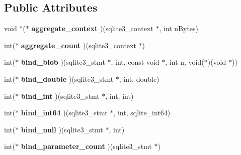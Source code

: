 \subsection*{Public Attributes}
\begin{DoxyCompactItemize}
\item 
\mbox{\label{structsqlite3__api__routines_a16fafb5f2460657f528338aee5f65d25}} 
void $\ast$($\ast$ {\bfseries aggregate\+\_\+context} )(sqlite3\+\_\+context $\ast$, int n\+Bytes)
\item 
\mbox{\label{structsqlite3__api__routines_a8373f7a5dd2d6f1c86bbf024b1796156}} 
int($\ast$ {\bfseries aggregate\+\_\+count} )(sqlite3\+\_\+context $\ast$)
\item 
\mbox{\label{structsqlite3__api__routines_afeb41d70ab5a221fec488560934c825b}} 
int($\ast$ {\bfseries bind\+\_\+blob} )(sqlite3\+\_\+stmt $\ast$, int, const void $\ast$, int n, void($\ast$)(void $\ast$))
\item 
\mbox{\label{structsqlite3__api__routines_aca43a229ce28397ba8c18a4d6e03e40c}} 
int($\ast$ {\bfseries bind\+\_\+double} )(sqlite3\+\_\+stmt $\ast$, int, double)
\item 
\mbox{\label{structsqlite3__api__routines_a6fef49e6c9c1fa573c55cc6668a8448f}} 
int($\ast$ {\bfseries bind\+\_\+int} )(sqlite3\+\_\+stmt $\ast$, int, int)
\item 
\mbox{\label{structsqlite3__api__routines_a489304cada65abca390da9b751da8800}} 
int($\ast$ {\bfseries bind\+\_\+int64} )(sqlite3\+\_\+stmt $\ast$, int, sqlite\+\_\+int64)
\item 
\mbox{\label{structsqlite3__api__routines_a74d16d0bb57db37d654e95fb7e72c93c}} 
int($\ast$ {\bfseries bind\+\_\+null} )(sqlite3\+\_\+stmt $\ast$, int)
\item 
\mbox{\label{structsqlite3__api__routines_ab27285b7fb132f697d5ef22f21469dd6}} 
int($\ast$ {\bfseries bind\+\_\+parameter\+\_\+count} )(sqlite3\+\_\+stmt $\ast$)
\item 

\end{DoxyCompactItemize}
